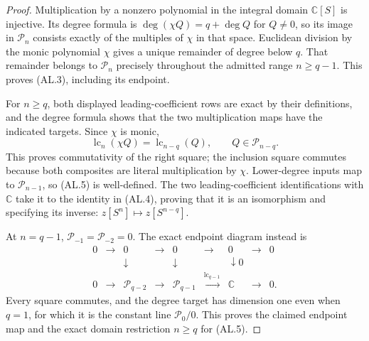 \documentclass[11pt]{article}
\newcommand{\calP}{\mathcal P}
\begin{document}
\begin{proof}
Multiplication by a nonzero polynomial in the integral domain $\mathbb C[S]$
is injective. Its degree formula is
$\deg(\chi Q)=q+\deg Q$ for $Q\ne0$, so its image in $\calP_n$ consists
exactly of the multiples of $\chi$ in that space. Euclidean division by the
monic polynomial $\chi$ gives a unique remainder of degree below $q$.
That remainder belongs to $\calP_n$ precisely throughout the admitted range
$n\ge q-1$. This proves (AL.3), including its endpoint.

For $n\ge q$, both displayed leading-coefficient rows are exact by their
definitions, and the degree formula shows that the two multiplication maps
have the indicated targets. Since $\chi$ is monic,
\begin{equation}\tag{AL.6}
 \operatorname{lc}_n(\chi Q)=\operatorname{lc}_{n-q}(Q),
 \qquad Q\in\calP_{n-q}.
\end{equation}
This proves commutativity of the right square; the inclusion square commutes
because both composites are literal multiplication by $\chi$. Lower-degree
inputs map to $\calP_{n-1}$, so (AL.5) is well-defined. The two
leading-coefficient identifications with $\mathbb C$ take it to the identity
in (AL.4), proving that it is an isomorphism and specifying its inverse:
$z[S^n]\mapsto z[S^{n-q}]$.

At $n=q-1$, $\calP_{-1}=\calP_{-2}=0$. The exact endpoint diagram instead is
\begin{equation}\tag{AL.7}
\begin{array}{ccccccccc}
0&\longrightarrow&0&\longrightarrow&0&\longrightarrow&0
 &\longrightarrow&0\\
 &&\downarrow&&\downarrow&&\downarrow\scriptstyle 0&&\\
0&\longrightarrow&\calP_{q-2}&\longrightarrow&\calP_{q-1}
 &\xrightarrow{\operatorname{lc}_{q-1}}&\mathbb C&\longrightarrow&0.
\end{array}
\end{equation}
Every square commutes, and the degree target has dimension one even when
$q=1$, for which it is the constant line $\calP_0/0$. This proves the claimed
endpoint map and the exact domain restriction $n\ge q$ for (AL.5).
\end{proof}
\end{document}
